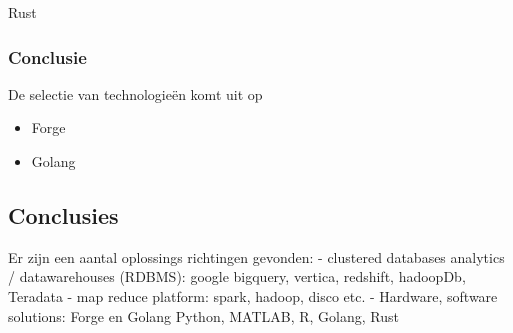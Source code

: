 Rust

\subsubsection{\textbf{Conclusie}}

De selectie van technologieën komt uit op

\begin{itemize}
    \item Forge
    \item Golang
\end{itemize}


\subsection{Conclusies}

Er zijn een aantal oplossings richtingen gevonden:
- clustered databases analytics / datawarehouses (RDBMS): google bigquery, vertica, redshift, hadoopDb, Teradata
- map reduce platform: spark, hadoop, disco etc.
- Hardware, software solutions: Forge en Golang Python, MATLAB, R, Golang, Rust

